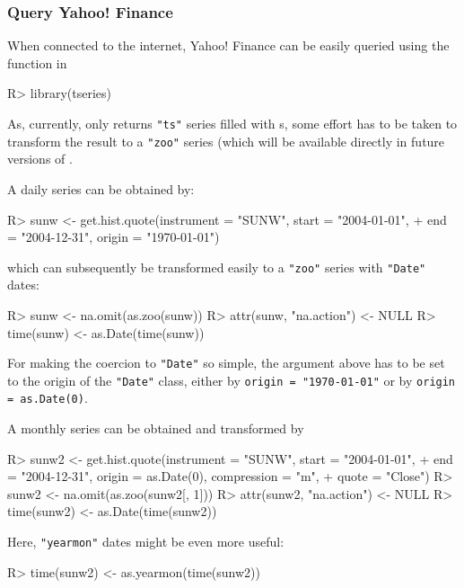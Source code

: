 \documentclass{Z}
\newcommand{\mysection}[1]{\subsubsection[#1]{\textbf{#1}}}
\begin{document}
\mysection{Query Yahoo! Finance}

When connected to the internet, Yahoo! Finance can be easily queried using
the  function in
\begin{Schunk}
\begin{Sinput}
R> library(tseries)
\end{Sinput}
\end{Schunk}


As, currently,  only returns \verb/"ts"/ series filled with
s, some effort has to be taken to transform the result to a \verb/"zoo"/
series (which will be available directly in future versions of .

A daily series can be obtained by:
\begin{Schunk}
\begin{Sinput}
R> sunw <- get.hist.quote(instrument = "SUNW", start = "2004-01-01", 
+     end = "2004-12-31", origin = "1970-01-01")
\end{Sinput}
\end{Schunk}
which can subsequently be transformed easily to a \verb/"zoo"/ series with \verb/"Date"/
dates:
\begin{Schunk}
\begin{Sinput}
R> sunw <- na.omit(as.zoo(sunw))
R> attr(sunw, "na.action") <- NULL
R> time(sunw) <- as.Date(time(sunw))
\end{Sinput}
\end{Schunk}
For making the coercion to \verb/"Date"/ so simple, the  argument above
has to be set to the origin of the \verb/"Date"/ class, either by \verb/origin = "1970-01-01"/
or by \verb/origin = as.Date(0)/.

A monthly series can be obtained and transformed by
\begin{Schunk}
\begin{Sinput}
R> sunw2 <- get.hist.quote(instrument = "SUNW", start = "2004-01-01", 
+     end = "2004-12-31", origin = as.Date(0), compression = "m", 
+     quote = "Close")
R> sunw2 <- na.omit(as.zoo(sunw2[, 1]))
R> attr(sunw2, "na.action") <- NULL
R> time(sunw2) <- as.Date(time(sunw2))
\end{Sinput}
\end{Schunk}

Here, \verb/"yearmon"/ dates might be even more useful:
\begin{Schunk}
\begin{Sinput}
R> time(sunw2) <- as.yearmon(time(sunw2))
\end{Sinput}
\end{Schunk}
\end{document}
